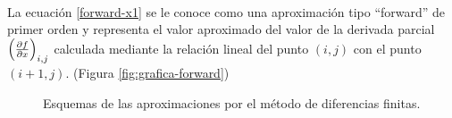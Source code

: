\documentclass[letterpaper, openright, 12pt]{book}
\begin{document}
	\paragraph*{}
	La ecuación \ref{forward-x1} se le conoce como una aproximación tipo ``forward'' de primer orden y representa el valor aproximado del valor de la derivada parcial $\left( \pdv{f}{x}\right)_{i,j}$ calculada mediante la relación lineal del punto $(i,j)$ con el punto $(i+1,j)$. (Figura \ref{fig:grafica-forward})
	
	\begin{figure}[htbp!]
		\centering
		\caption[Aproximaciones por Diferencias Finitas]{Esquemas de las aproximaciones por el método de diferencias finitas.\cite{chapra}}
	\end{figure}
	
\end{document}
